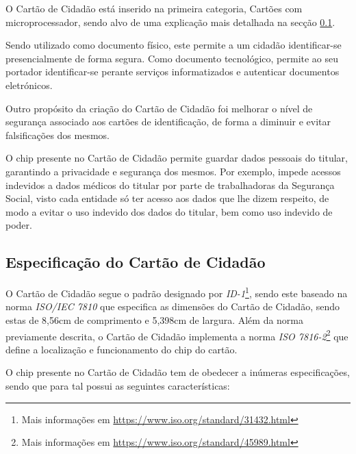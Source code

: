 O Cartão de Cidadão está inserido na primeira categoria, Cartões com microprocessador, sendo alvo de uma explicação mais detalhada na secção \ref{espCC}. 

Sendo utilizado como documento físico, este permite a um cidadão identificar-se presencialmente de forma segura. Como documento tecnológico, permite ao seu portador identificar-se perante serviços informatizados e autenticar documentos eletrónicos.

Outro propósito da criação do Cartão de Cidadão foi melhorar o nível de segurança associado aos cartões de identificação, de forma a diminuir e evitar falsificações dos mesmos.

O chip presente no Cartão de Cidadão permite guardar dados pessoais do titular, garantindo a privacidade e segurança dos mesmos. Por exemplo, impede acessos indevidos a dados médicos do titular por parte de trabalhadoras da Segurança Social, visto cada entidade só ter acesso aos dados que lhe dizem respeito, de modo a evitar o uso indevido dos dados do titular, bem como uso indevido de poder.

 

\subsection{Especificação do Cartão de Cidadão} \label{espCC}

O Cartão de Cidadão segue o padrão designado por \emph{ID-1}\footnote{Mais informações em \url{https://www.iso.org/standard/31432.html}}, sendo este baseado na norma \emph{ISO/IEC 7810} que especifica as dimensões do Cartão de Cidadão, sendo estas de 8,56cm de comprimento e 5,398cm de largura. Além da norma previamente descrita, o Cartão de Cidadão implementa a norma \emph{ISO 7816-2}\footnote{Mais informações em \url{https://www.iso.org/standard/45989.html}} que define a localização e funcionamento do chip do cartão.

O chip presente no Cartão de Cidadão tem de obedecer a inúmeras especificações, sendo que para tal possui as seguintes características:

